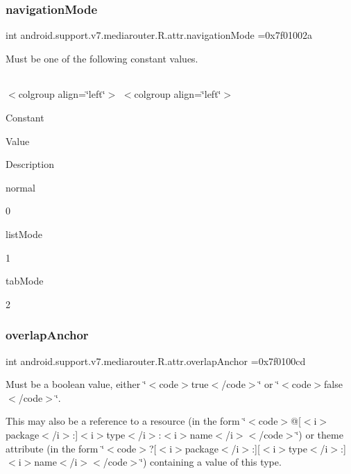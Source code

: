 \subsubsection{\texorpdfstring{navigation\+Mode}{navigationMode}}
{\footnotesize\ttfamily int android.\+support.\+v7.\+mediarouter.\+R.\+attr.\+navigation\+Mode =0x7f01002a\hspace{0.3cm}{\ttfamily [static]}}

Must be one of the following constant values.

\tabulinesep=1mm
\begin{longtabu} spread 0pt [c]{*{0}{|X[-1]}|}
\hline
\end{longtabu}
$<$colgroup align=\char`\"{}left\char`\"{}$>$ $<$colgroup align=\char`\"{}left\char`\"{}$>$ 

Constant

Value

Description 

{\ttfamily normal}

0

{\ttfamily list\+Mode}

1

{\ttfamily tab\+Mode}

2\mbox{\label{classandroid_1_1support_1_1v7_1_1mediarouter_1_1R_1_1attr_ac3121877d0453524ba0e96b87e36ad98}} 
\subsubsection{\texorpdfstring{overlap\+Anchor}{overlapAnchor}}
{\footnotesize\ttfamily int android.\+support.\+v7.\+mediarouter.\+R.\+attr.\+overlap\+Anchor =0x7f0100cd\hspace{0.3cm}{\ttfamily [static]}}

Must be a boolean value, either \char`\"{}$<$code$>$true$<$/code$>$\char`\"{} or \char`\"{}$<$code$>$false$<$/code$>$\char`\"{}. 

This may also be a reference to a resource (in the form \char`\"{}$<$code$>$@\mbox{[}$<$i$>$package$<$/i$>$\+:\mbox{]}$<$i$>$type$<$/i$>$\+:$<$i$>$name$<$/i$>$$<$/code$>$\char`\"{}) or theme attribute (in the form \char`\"{}$<$code$>$?\mbox{[}$<$i$>$package$<$/i$>$\+:\mbox{]}\mbox{[}$<$i$>$type$<$/i$>$\+:\mbox{]}$<$i$>$name$<$/i$>$$<$/code$>$\char`\"{}) containing a value of this type. \mbox{\label{classandroid_1_1support_1_1v7_1_1mediarouter_1_1R_1_1attr_ab54f21235724f13f9760dad1e6989074}} 
